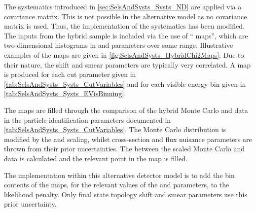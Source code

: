 The  systematics introduced in \autoref{sec:SelsAndSysts_Systs_ND} are applied via a covariance matrix. This is not possible in the alternative model as no covariance matrix is used. Thus, the implementation of the  systematics has been modified. The inputs from the hybrid  sample is included via the use of `` maps'', which are two-dimensional histograms in  and  parameters over some range. Illustrative examples of the  maps are given in \autoref{fig:SelsAndSysts_HybridChi2Maps}. Due to their nature, the shift and smear parameters are typically very correlated. A map is produced for each cut parameter given in \autoref{tab:SelsAndSysts_Systs_CutVariables} and for each visible energy bin given in \autoref{tab:SelsAndSysts_Systs_EVisBinning}.

The maps are filled through the  comparison of the hybrid  Monte Carlo and data in the particle identification parameters documented in \autoref{tab:SelsAndSysts_Systs_CutVariables}. The Monte Carlo distribution is modified by the  and  scaling, whilst cross-section and flux nuisance parameters are thrown from their prior uncertainties. The  between the scaled Monte Carlo and data is calculated and the relevant point in the  map is filled.

The implementation within this alternative detector model is to add the bin contents of the maps, for the relevant values of the  and  parameters, to the likelihood penalty. Only  final state topology shift and smear parameters use this prior uncertainty. 

